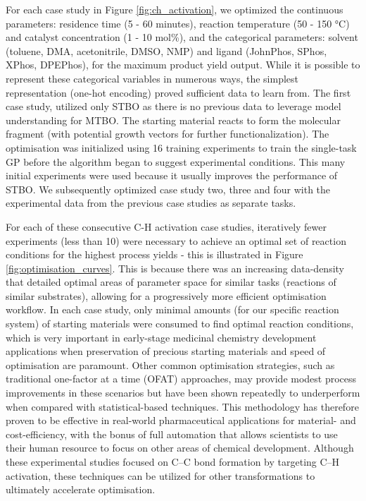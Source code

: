 For each case study in Figure \ref{fig:ch_activation}, we optimized the continuous parameters: residence time (5 - 60 minutes), reaction temperature (50 - 150 °C) and catalyst concentration (1 - 10 mol\%), and the categorical parameters: solvent (toluene, DMA, acetonitrile, DMSO, NMP) and ligand (JohnPhos, SPhos, XPhos, DPEPhos), for the maximum product yield output. While it is possible to represent these categorical variables in numerous ways, the simplest representation (one-hot encoding) proved sufficient data to learn from. The first case study, utilized only STBO as there is no previous data to leverage model understanding for MTBO. The starting material reacts to form the molecular fragment (with potential growth vectors for further functionalization). The optimisation was initialized using 16 training experiments to train the single-task GP before the algorithm began to suggest experimental conditions. This many initial experiments were used because it usually improves the performance of STBO. We subsequently optimized case study two, three and four with the experimental data from the previous case studies as separate tasks.

For each of these consecutive C-H activation case studies, iteratively fewer experiments (less than 10) were necessary to achieve an optimal set of reaction conditions for the highest process yields - this is illustrated in Figure \ref{fig:optimisation_curves}. This is because there was an increasing data-density that detailed optimal areas of parameter space for similar tasks (reactions of similar substrates), allowing for a progressively more efficient optimisation workflow. In each case study, only minimal amounts (for our specific reaction system) of starting materials were consumed to find optimal reaction conditions, which is very important in early-stage medicinal chemistry development applications when preservation of precious starting materials and speed of optimisation are paramount. Other common optimisation strategies, such as traditional one-factor at a time (OFAT) approaches, may provide modest process improvements in these scenarios but have been shown repeatedly to underperform when compared with statistical-based techniques. This methodology has therefore proven to be effective in real-world pharmaceutical applications for material- and cost-efficiency, with the bonus of full automation that allows scientists to use their human resource to focus on other areas of chemical development. Although these experimental studies focused on C--C bond formation by targeting C--H activation, these techniques can be utilized for other transformations to ultimately accelerate optimisation.

